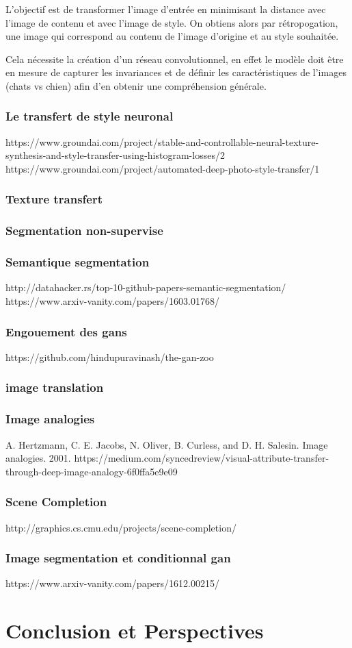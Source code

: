 \documentclass[a4paper, 12pt]{book}
\begin{document}
L'objectif est de transformer l'image d'entrée en minimisant la distance avec l'image de contenu et avec l'image de style. On obtiens alors par rétropogation, une image qui correspond au contenu de l'image d'origine et au style souhaitée.

Cela nécessite la création d'un réseau convolutionnel, en effet le modèle doit être en mesure de capturer les invariances et de définir les caractéristiques de l'images (chats vs chien) afin d'en obtenir une compréhension générale.

\subsection{Le transfert de style neuronal}
https://www.groundai.com/project/stable-and-controllable-neural-texture-synthesis-and-style-transfer-using-histogram-losses/2
https://www.groundai.com/project/automated-deep-photo-style-transfer/1

\subsection{Texture transfert}

\subsection{Segmentation non-supervise}
\subsection{Semantique segmentation}
http://datahacker.rs/top-10-github-papers-semantic-segmentation/
https://www.arxiv-vanity.com/papers/1603.01768/

 
 
\subsection{Engouement des gans}
https://github.com/hindupuravinash/the-gan-zoo

\subsection{image translation}

\subsection{Image analogies}
A. Hertzmann, C. E. Jacobs, N. Oliver, B. Curless, and D. H.
Salesin. Image analogies. 2001.
https://medium.com/syncedreview/visual-attribute-transfer-through-deep-image-analogy-6f0ffa5e9e09

\subsection{Scene Completion}
http://graphics.cs.cmu.edu/projects/scene-completion/

\subsection{Image segmentation et conditionnal gan}
https://www.arxiv-vanity.com/papers/1612.00215/



\chapter{Conclusion et Perspectives\label{chap-conclusion}}



\end{document}

